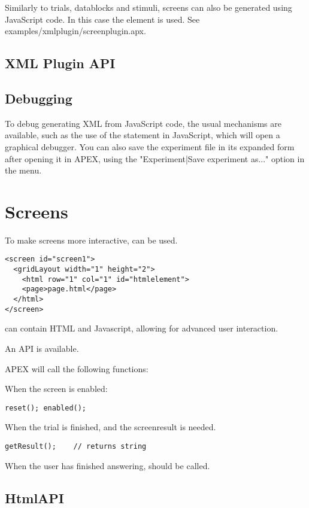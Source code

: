 Similarly to trials, datablocks and stimuli, screens can also be generated using JavaScript code. In this case the  element is used. See examples/xmlplugin/screenplugin.apx.

\subsection{XML Plugin API}
\label{sec:xmlpluginapi}





\subsection{Debugging}

To debug generating XML from JavaScript code, the usual mechanisms are available, such as the use of the  statement in JavaScript, which will open a graphical debugger. You can also save the experiment file in its expanded form after opening it in APEX, using the "Experiment|Save experiment as..." option in the menu.


\section{Screens}

To make screens more interactive,  can be used.

\begin{lstlisting}
<screen id="screen1">
  <gridLayout width="1" height="2">
    <html row="1" col="1" id="htmlelement">
    <page>page.html</page>
  </html>
</screen>
\end{lstlisting}

 can contain HTML and Javascript, allowing for advanced user interaction.


An API is available.

APEX will call the following functions:

When the screen is enabled:

\begin{lstlisting}
reset(); enabled();
\end{lstlisting}


When the trial is finished, and the screenresult is needed.

\begin{lstlisting}
getResult();    // returns string
\end{lstlisting}


When the user has finished answering,  should be called.



\subsection{HtmlAPI}


